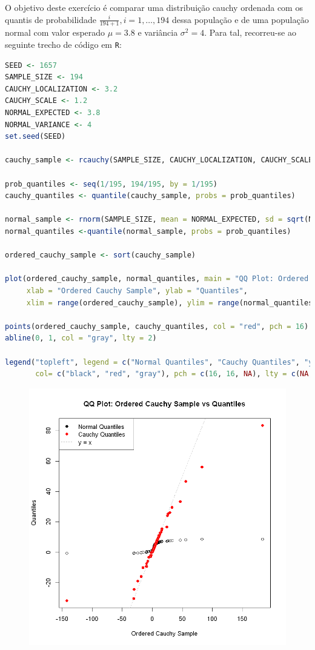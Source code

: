 \documentclass[12pt,a4paper]{article}
\begin{document}
O objetivo deste exercício é comparar uma distribuição cauchy ordenada com os
quantis de probabilidade $\frac{i}{194 + 1}, i = 1,…,194$ dessa população e de
uma população normal com valor esperado $\mu = 3.8$ e variância $\sigma^{2} =
  4$. Para tal, recorreu-se ao seguinte trecho de código em \texttt{R}:

\quad

\begin{lstlisting}[language=R]
SEED <- 1657
SAMPLE_SIZE <- 194
CAUCHY_LOCALIZATION <- 3.2
CAUCHY_SCALE <- 1.2
NORMAL_EXPECTED <- 3.8
NORMAL_VARIANCE <- 4
set.seed(SEED)

cauchy_sample <- rcauchy(SAMPLE_SIZE, CAUCHY_LOCALIZATION, CAUCHY_SCALE)

prob_quantiles <- seq(1/195, 194/195, by = 1/195)
cauchy_quantiles <- quantile(cauchy_sample, probs = prob_quantiles)

normal_sample <- rnorm(SAMPLE_SIZE, mean = NORMAL_EXPECTED, sd = sqrt(NORMAL_VARIANCE))
normal_quantiles <-quantile(normal_sample, probs = prob_quantiles)

ordered_cauchy_sample <- sort(cauchy_sample)

plot(ordered_cauchy_sample, normal_quantiles, main = "QQ Plot: Ordered Cauchy Sample vs Quantiles",
     xlab = "Ordered Cauchy Sample", ylab = "Quantiles",
     xlim = range(ordered_cauchy_sample), ylim = range(normal_quantiles, cauchy_quantiles))

points(ordered_cauchy_sample, cauchy_quantiles, col = "red", pch = 16)
abline(0, 1, col = "gray", lty = 2)

legend("topleft", legend = c("Normal Quantiles", "Cauchy Quantiles", "y = x"),
       col= c("black", "red", "gray"), pch = c(16, 16, NA), lty = c(NA, NA, 2))

\end{lstlisting}

\quad

\begin{figure}[h]
  \centering
  \includegraphics[scale = 0.8]{./ex08.png}
\end{figure}
\end{document}
